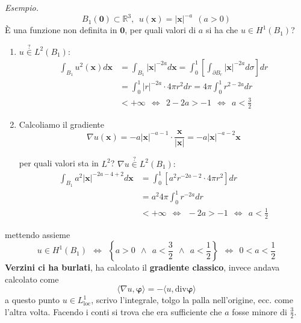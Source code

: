 \documentclass[10pt,a4paper,twoside,openright]{book}
\newcommand{\x}{\mathbf{x}}
\newcommand{\zer}{\mathbf{0}}
\begin{document}
\textit{Esempio.}
\begin{equation*}
	B_{1}(\zer) \subset \mathbb{R}^{3} ,\ \ u(\x) =| \x| ^{-a} \ \ ( a >0)
\end{equation*}
È una funzione non definita in $\zer$, per quali valori di $a$ si ha che $u\in H^{1}( B_{1})$?
\begin{enumerate}
	\item $u\overset{?}{\in } L^{2}( B_{1}) :$\begin{align*}
	      \int _{B_{1}} u^{2}(\x) d\x & =\int _{B_{1}}| \x| ^{-2a} d\x =\int ^{1}_{0}\left[\int _{\partial B_{r}}| \x| ^{-2a} d\sigma \right] dr\\
	      & =\int ^{1}_{0}| r| ^{-2a} \cdotp 4\pi r^{2} dr=4\pi \int ^{1}_{0} r^{2-2a} dr\\
	      & < +\infty \ \ \Leftrightarrow \ \ 2-2a >-1\ \ \Leftrightarrow \ \ a< \frac{3}{2}
	\end{align*}
	\item Calcoliamo il gradiente\begin{equation*}
	      \nabla u(\x) =-a| \x| ^{-a-1} \cdotp \frac{\x}{| \x| } =-a| \x| ^{-a-2}\x
	\end{equation*}
	
	per quali valori sta in $L^{2}$? $\nabla u\overset{?}{\in } L^{2}( B_{1}) :$\begin{align*}
	\int _{B_{1}} a^{2}| \x| ^{-2a-4+2} d\x & =\int ^{1}_{0}\left[ a^{2} r^{-2a-2} \cdotp 4\pi r^{2}\right] dr\\
	& =a^{2} 4\pi \int ^{1}_{0} r^{-2a} dr\\
	& < +\infty \ \ \Leftrightarrow \ \ -2a >-1\ \ \Leftrightarrow \ \ a< \frac{1}{2}
	\end{align*}
\end{enumerate}

mettendo assieme
\begin{equation*}
	u\in H^{1}( B_{1}) \ \ \Leftrightarrow \ \ \left\{a >0\ \ \land \ \ a< \frac{3}{2} \ \ \land \ \ a< \frac{1}{2}\right\} \ \ \Leftrightarrow \ \ 0< a< \frac{1}{2}
\end{equation*}
\textbf{Verzini ci ha burlati}, ha calcolato il \textbf{gradiente classico}, invece andava calcolato come
\begin{equation*}
	\langle \nabla u,\bm{\varphi} \rangle =-\langle u,\mathrm{div}\bm{\varphi} \rangle 
\end{equation*}
a questo punto $u\in L^{1}_{\mathrm{loc}}$, scrivo l'integrale, tolgo la palla nell'origine, ecc. come l'altra volta. Facendo i conti si trova che era sufficiente che $a$ fosse minore di $\frac{3}{2}$.
\end{document}
